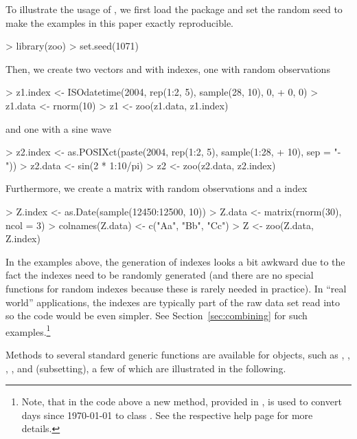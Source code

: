 \documentclass{Z}
\begin{document}
To illustrate the usage of , we first load the package and set the
random seed to make the examples in this paper exactly reproducible.

\begin{Schunk}
\begin{Sinput}
> library(zoo)
> set.seed(1071)
\end{Sinput}
\end{Schunk}

Then, we create two vectors  and  with  
indexes, one with random observations
\begin{Schunk}
\begin{Sinput}
> z1.index <- ISOdatetime(2004, rep(1:2, 5), sample(28, 10), 0, 
+     0, 0)
> z1.data <- rnorm(10)
> z1 <- zoo(z1.data, z1.index)
\end{Sinput}
\end{Schunk}
and one with a sine wave
\begin{Schunk}
\begin{Sinput}
> z2.index <- as.POSIXct(paste(2004, rep(1:2, 5), sample(1:28, 
+     10), sep = "-"))
> z2.data <- sin(2 * 1:10/pi)
> z2 <- zoo(z2.data, z2.index)
\end{Sinput}
\end{Schunk}
Furthermore, we create a matrix  with random observations and a 
index
\begin{Schunk}
\begin{Sinput}
> Z.index <- as.Date(sample(12450:12500, 10))
> Z.data <- matrix(rnorm(30), ncol = 3)
> colnames(Z.data) <- c("Aa", "Bb", "Cc")
> Z <- zoo(Z.data, Z.index)
\end{Sinput}
\end{Schunk}
In the examples above, the generation of indexes looks a bit awkward
due to the fact the indexes need to be randomly generated (and there 
are no special functions for random indexes because these is rarely 
needed in practice). In ``real world'' applications, the indexes
are typically part of the raw data set read into  so the
code would be even simpler. See Section~\ref{sec:combining}
for such examples.\footnote{Note, that in the code above a new 
method, provided in , is used to convert days 
since 1970-01-01 to class . See the respective help page 
for more details.}

Methods to several standard generic functions are available for
 objects, such as , , , ,
 and \code{[} (subsetting), a few of which are illustrated in
the following. 
\end{document}
